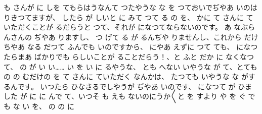 も
さんが
に
しを
てもらはうなんて
つたやうな
な
を
つておいでぢやあ
いのは
りきつてますが、
したら
が
しいと
に
みて
つて
る
の
を、
かに
て
さんに
ていただくことが
るだらうと
つて、それが
になつてならないのです。
あ
なぶらんさんの
ぢやあ
りますし、
つ
げて
る
が
るんぢや
りませんし、これから
だけ
ちやあ
なる
だつて
ふんでも
いのですから、
にやあ
えずに
つて
ても、
になつたらまあ
ばかりでも
らしいことが
ることだらう！、と
ふと
だか
に
なくなつて、
の
が
い
い……
い
を
い
に
るやうな、
とも
へない
いやうな
が
て、とても
の
の
むだけの
を
て
さんに
ていただく
なんかは、
たつても
いやうな
な
がするんです。
いつたら
ひなさるでしやうが
ぢやあ
いのです、
になつて
が
ひました
が
に
に
んで
て、いつそ
も
えも
ないのにうか〳〵と
を
すより
や
を
ぐ
でも
な
い
を、
の
の
に
